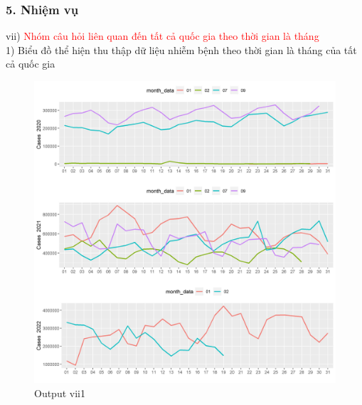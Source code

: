\documentclass[english,10pt,table]{beamer}
\begin{document}
\begin{frame}[fragile]
\frametitle{5.  Nhiệm vụ}
vii) \textcolor{red}{Nhóm câu hỏi liên quan đến tất cả quốc gia theo thời gian là tháng }\\
    1) Biểu đồ thể hiện thu thập dữ liệu nhiễm bệnh theo thời gian là tháng của tất cả quốc gia
	\begin{figure}[h!]
	\begin{center}
		    \includegraphics[scale = 0.28]{Images/VII/vii1 World .jpeg}
		     \caption{Output vii1}
		\end{center}
		\end{figure}
\end{frame}
\end{document}
